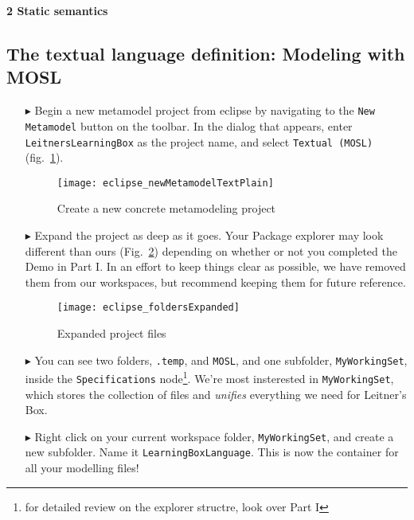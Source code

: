 \newpage
\texHeader

{\bf \Large 2 \hspace{0.5cm}Static semantics}

\subsection{The textual language definition: Modeling with MOSL}
\label{sec:staticConcrete}

\begin{itemize}

\item[$\blacktriangleright$] \hypertarget{static tex}{Begin a} new metamodel project from eclipse by navigating to the \texttt{New Metamodel} button on the toolbar. In the dialog that appears, enter \texttt{LeitnersLearningBox} as the project name, and select \texttt{Textual (MOSL)}  (fig.~\ref{fig:new_project}).

\begin{figure}[htbp]
	\centering
  \texttt{[image: eclipse\_newMetamodelTextPlain]}
	\caption{Create a new concrete metamodeling project}
	\label{fig:new_project}
\end{figure}

\item[$\blacktriangleright$] Expand the project as deep as it goes. Your Package explorer may look different than ours (Fig.~\ref{fig:expanded_folders}) depending on whether or not you completed the Demo in Part I. In an effort to keep things clear as possible, we have removed them from our workspaces, but recommend keeping them for future reference.

\begin{figure}[htbp]
	\centering
  \texttt{[image: eclipse\_foldersExpanded]}
	\caption{Expanded project files}
	\label{fig:expanded_folders}
\end{figure} 

\item[$\blacktriangleright$] You can see two folders, \texttt{.temp}, and \texttt{MOSL}, and one subfolder, \texttt{MyWorkingSet}, inside the \texttt{Specifications} node\footnote{for detailed review on the explorer structre, look over Part I}. We're most insterested in \texttt{MyWorkingSet}, which stores the collection of files and  \emph{unifies} everything we need for Leitner's Box. 

\item[$\blacktriangleright$] Right click on your current workspace folder, \texttt{MyWorkingSet}, and create a new subfolder. Name it \texttt{LearningBoxLanguage}. This is now the container for all your modelling files!



\end{itemize}
